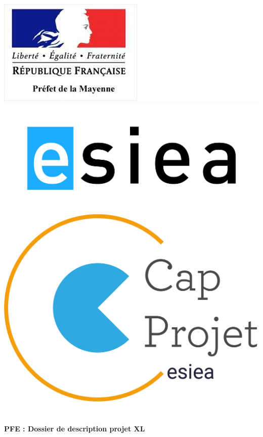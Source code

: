 \begin{titlepage}
\begin{center}

\includegraphics [scale=0.45] {images/logoPref.jpeg} \includegraphics [scale=0.35] {images/ESIEA.JPG} \includegraphics [scale=0.2] {images/capProjet.png} ~\\[1.5cm] 

\textsc {\LARGE }\\[5cm]

{ \LARGE \bfseries PFE : Dossier de description projet XL\\[0.4cm] }


\end{center}
\end{titlepage}
